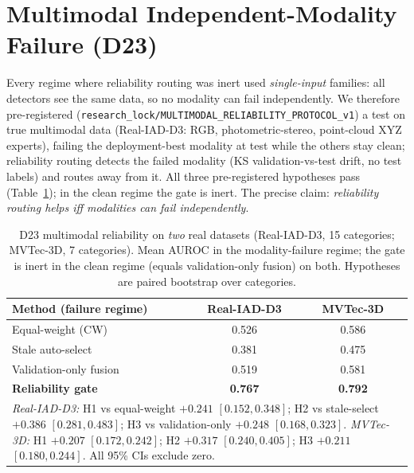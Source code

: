 \documentclass[11pt,titlepage]{article}
\begin{document}
\section{Multimodal Independent-Modality Failure (D23)}
\label{sec:d23}
Every regime where reliability routing was inert used \emph{single-input}
families: all detectors see the same data, so no modality can fail independently.
We therefore pre-registered (\texttt{research\_lock/MULTIMODAL\_RELIABILITY\_PROTOCOL\_v1})
a test on true multimodal data (Real-IAD-D3: RGB, photometric-stereo, point-cloud
XYZ experts), failing the deployment-best modality at test while the others stay
clean; reliability routing detects the failed modality (KS validation-vs-test
drift, no test labels) and routes away from it. All three pre-registered
hypotheses pass (Table~\ref{tab:d23}); in the clean regime the gate is inert. The
precise claim: \emph{reliability routing helps iff modalities can fail
independently}.

\begin{table}[t]\centering
\caption{D23 multimodal reliability on \emph{two} real datasets (Real-IAD-D3, 15
categories; MVTec-3D, 7 categories). Mean AUROC in the modality-failure regime; the
gate is inert in the clean regime (equals validation-only fusion) on both. Hypotheses
are paired bootstrap over categories.}
\label{tab:d23}\footnotesize
\begin{tabular}{lcc}
\toprule
\textbf{Method (failure regime)} & Real-IAD-D3 & MVTec-3D \\
\midrule
Equal-weight (CW) & 0.526 & 0.586 \\
Stale auto-select & 0.381 & 0.475 \\
Validation-only fusion & 0.519 & 0.581 \\
\textbf{Reliability gate} & \textbf{0.767} & \textbf{0.792} \\
\midrule
\multicolumn{3}{p{0.92\linewidth}}{\emph{Real-IAD-D3:} H1 vs equal-weight $+0.241$ $[0.152,0.348]$; H2 vs stale-select $+0.386$ $[0.281,0.483]$; H3 vs validation-only $+0.248$ $[0.168,0.323]$. \emph{MVTec-3D:} H1 $+0.207$ $[0.172,0.242]$; H2 $+0.317$ $[0.240,0.405]$; H3 $+0.211$ $[0.180,0.244]$. All 95\% CIs exclude zero.}\\
\bottomrule
\end{tabular}
\end{table}
\end{document}
